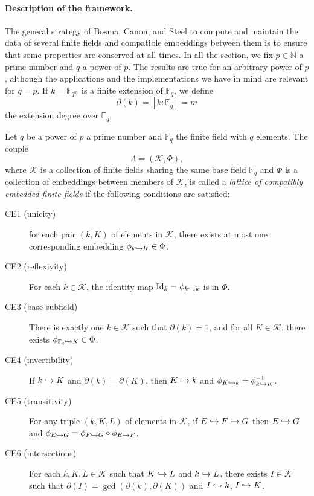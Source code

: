 \paragraph{Description of the framework.} The general strategy of Bosma, Canon,
and Steel to compute and maintain the data of several finite fields and
compatible embeddings between them is to ensure that some properties are
conserved at all times. In all the section, we fix $p\in\mathbb{N}$ a prime
number and $q$ a power of $p$. The results are true for an arbitrary power of
$p$, although the applications and the implementations we have in mind are
relevant for $q=p$. If $k=\mathbb{F}_{q^m}$ is a finite extension of
$\mathbb{F}_q$, we define
\[
  \partial (k) = \left[ k:\mathbb{F}_q \right] = m
\]
the extension degree over $\mathbb{F}_q$.
\begin{defi}
  \label{defi:lattice-bcs}
  Let $q$ be a power of $p$ a prime number and $\mathbb{F}_q$ the finite field
  with $q$ elements. The couple
\[
  \Lambda = (\mathcal K, \Phi),
\]
where $\mathcal K$ is a collection of finite fields sharing the same base field
$\mathbb{F}_q$ and $\Phi$ is a collection of embeddings between members of
$\mathcal K$,
is called a \emph{lattice of compatibly embedded finite fields} if the following
conditions are satisfied:
\begin{description}
  \item[CE1 (unicity)] for each pair $(k, K)$ of elements in $\mathcal K$, there exists
    at most one corresponding embedding $\phi_{k\hookrightarrow K}\in\Phi$.
    \item[CE2 (reflexivity)] For each $k\in \mathcal K$, the identity map
    $\operatorname{Id}_k=\phi_{k\hookrightarrow k}$ is in $\Phi$.
  \item[CE3 (base subfield)] There is exactly one $k\in \mathcal K$ such that
    $\partial(k)=1$, and for all $K\in \mathcal K$, there exists $\phi_{\mathbb{F}_q\hookrightarrow K}\in\Phi$.
  \item[CE4 (invertibility)] If $k\hookrightarrow K$ and $\partial(k)=\partial(K)$, then $K\hookrightarrow k$ and
    $\phi_{K\hookrightarrow k}=\phi_{k\hookrightarrow K}^{-1}$.
  \item[CE5 (transitivity)] For any triple $(k, K, L)$ of elements in $\mathcal
    K$, if $E\hookrightarrow F\hookrightarrow G$ then $E\hookrightarrow G$ and
    $\phi_{E\hookrightarrow G}=\phi_{F\hookrightarrow G}\circ\phi_{E\hookrightarrow F}$.
  \item[CE6 (intersections)] For each $k, K, L\in \mathcal K$ such that $K\hookrightarrow L$ and
    $k\hookrightarrow L$, there exists $I\in \mathcal K$ such that
    $\partial(I)=\gcd(\partial(k), \partial(K))$
    and $I\hookrightarrow k$, $I\hookrightarrow K$.
\end{description}
\end{defi}
